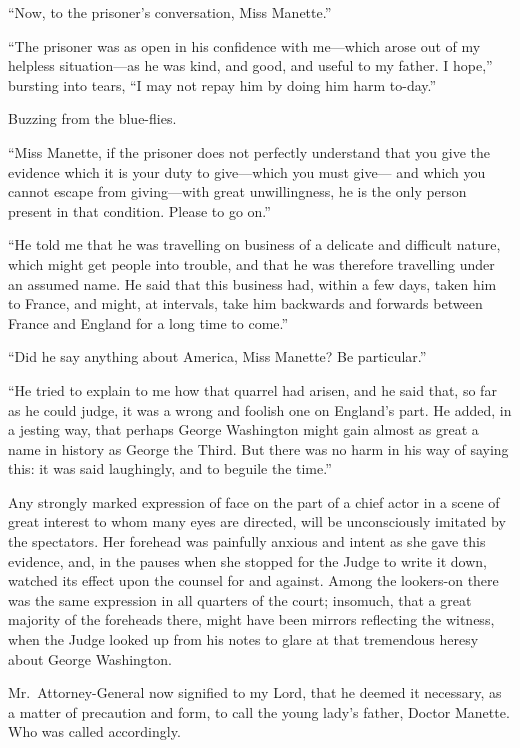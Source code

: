 ``Now, to the prisoner's conversation, Miss Manette.''

``The prisoner was as open in his confidence with me---which arose out
of my helpless situation---as he was kind, and good, and useful to my
father.  I hope,'' bursting into tears, ``I may not repay him by doing
him harm to-day.''

Buzzing from the blue-flies.

``Miss Manette, if the prisoner does not perfectly understand that you
give the evidence which it is your duty to give---which you must give---%
and which you cannot escape from giving---with great unwillingness,
he is the only person present in that condition.  Please to go on.''

``He told me that he was travelling on business of a delicate and
difficult nature, which might get people into trouble, and that he
was therefore travelling under an assumed name.  He said that this
business had, within a few days, taken him to France, and might,
at intervals, take him backwards and forwards between France and
England for a long time to come.''

``Did he say anything about America, Miss Manette?  Be particular.''

``He tried to explain to me how that quarrel had arisen, and he said that,
so far as he could judge, it was a wrong and foolish one on England's
part.  He added, in a jesting way, that perhaps George Washington
might gain almost as great a name in history as George the Third.
But there was no harm in his way of saying this:  it was said laughingly,
and to beguile the time.''

Any strongly marked expression of face on the part of a chief actor
in a scene of great interest to whom many eyes are directed, will be
unconsciously imitated by the spectators.  Her forehead was painfully
anxious and intent as she gave this evidence, and, in the pauses when
she stopped for the Judge to write it down, watched its effect upon
the counsel for and against.  Among the lookers-on there was the same
expression in all quarters of the court; insomuch, that a great
majority of the foreheads there, might have been mirrors reflecting
the witness, when the Judge looked up from his notes to glare at that
tremendous heresy about George Washington.

Mr.\ Attorney-General now signified to my Lord, that he deemed it
necessary, as a matter of precaution and form, to call the young
lady's father, Doctor Manette.  Who was called accordingly.

